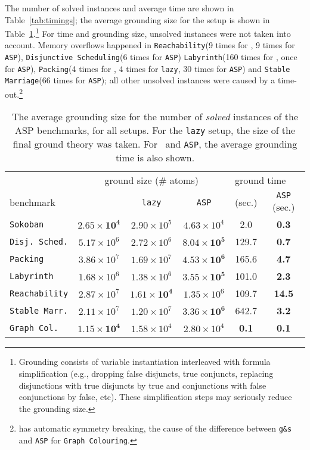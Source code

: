 \documentclass[11pt]{article}
\newcommand{\logicname}[1]{\text{\sc #1}\xspace}
\newcommand{\idp}{\logicname{IDP}}
\theoremstyle{plain}
\theoremstyle{definition}
\theoremstyle{example_basic}
\theoremstyle{example_contd}
\theoremstyle{plain}
\newcommand{\reach}				{\texttt{Reachability}\xspace}
\newcommand{\stablemarriage}	{\texttt{Stable Marriage}\xspace}
\newcommand{\colouring}			{\texttt{Graph Colouring}\xspace}
\newcommand{\packing}			{\texttt{Packing}\xspace}
\newcommand{\disjsched}			{\texttt{Disjunctive Scheduling}\xspace}
\newcommand{\labyrinth}			{\texttt{Labyrinth}\xspace}
\newcommand{\reachs}			{\texttt{Reachability}\xspace}
\newcommand{\stablemarriages}	{\texttt{Stable Marr.}\xspace}
\newcommand{\colourings}		{\texttt{Graph Col.}\xspace}
\newcommand{\packings}			{\texttt{Packing}\xspace}
\newcommand{\sokobans}			{\texttt{Sokoban}\xspace}
\newcommand{\disjscheds}		{\texttt{Disj. Sched.}\xspace}
\newcommand{\labyrinths}		{\texttt{Labyrinth}\xspace}
\newcommand{\tbf}[1]{\textbf{#1}}
\newcommand{\change}[1]{#1}
\begin{document}
The number of solved instances and average time are shown in Table~\ref{tab:timings}; the average grounding size for the \idp setup is shown in Table~\ref{tab:groundings}.\footnote{\change{Grounding consists of variable instantiation interleaved with formula simplification (e.g., dropping false disjuncts, true conjuncts, replacing disjunctions with true disjuncts by true and conjunctions with false conjunctions by false, etc). These simplification steps may seriously reduce the grounding size.}
} \change{For time and grounding size, unsolved instances were not taken into account. Memory overflows happened in \reach (9 times for \gs, 9 times for \texttt{ASP}), \disjsched (6 times for \texttt{ASP}) \labyrinth (160 times for \gs, once for \texttt{ASP}), \packing (4 times for \gs, 4 times for \texttt{lazy}, 30 times for \texttt{ASP}) and \stablemarriage (66 times for \texttt{ASP}); all other unsolved instances were caused by a time-out.}\footnote{\idp has automatic symmetry breaking, the cause of the difference between \texttt{g\&s} and \texttt{ASP} for \colouring.}

\begin{table}
\centering
\begin{tabularx}{0.95\textwidth}{l||c|c|c||c|c}
\multicolumn{1}{l||}{} 	& \multicolumn{3}{c||}{ground size (\# atoms)} & \multicolumn{2}{l}{ground time}\\
benchmark 				& \gs & \texttt{lazy} & \texttt{ASP} & \gs (sec.) & \texttt{ASP} (sec.)\\
\hline
\hline
\sokobans			&$\mathbf{2.65\times 10^4}$	&$2.90\times 10^5$ &$4.63\times 10^4$			& 2.0	&\tbf{0.3}\\	
\disjscheds			&$5.17\times 10^6$			&$2.72\times 10^6$ &$\mathbf{8.04\times 10^5}$	& 129.7	&\tbf{0.7}\\
\packings			&$3.86\times 10^7$			&$1.69\times 10^7$ &$\mathbf{4.53\times 10^6}$	& 165.6	&\tbf{4.7}\\
\labyrinths			&$1.68\times 10^6$			&$1.38\times 10^6$ &$\mathbf{3.55\times 10^5}$	& 101.0	&\tbf{2.3}\\
\reachs				&$2.87\times 10^7$			&$\mathbf{1.61\times 10^4}$ &$1.35\times 10^6$	& 109.7	&\tbf{14.5}\\
\stablemarriages	&$2.11\times 10^7$			&$1.20\times 10^7$ &$\mathbf{3.36\times 10^6}$	& 642.7	&\tbf{3.2}\\
\colourings			&$\mathbf{1.15\times 10^4}$	&$1.58\times 10^4$ &$2.80\times 10^4$		& \tbf{0.1}	&\tbf{0.1}
\end{tabularx}
\caption{\change{The average grounding size for the number of \emph{solved} instances of the ASP benchmarks, for all setups. For the \texttt{lazy} setup, the size of the final ground theory was taken. For \gs\ and \texttt{ASP}, the average grounding time is also shown.}}
\label{tab:groundings}
\end{table}
\end{document}
